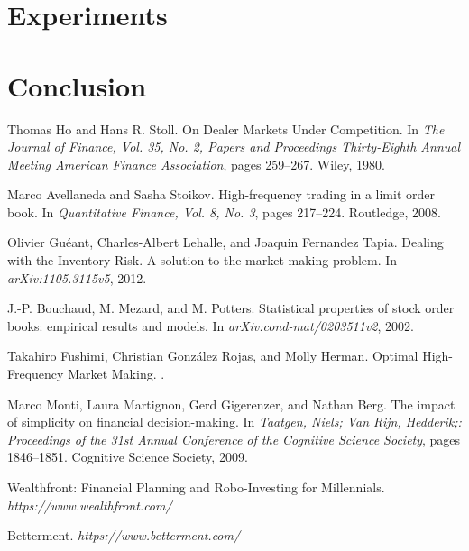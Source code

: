 \documentclass{article}
\begin{document}
\section{Experiments}
\label{sec:experiments}

\lipsum[3]
\lipsum[4]

\section{Conclusion}
\label{sec:conclusion}

\lipsum[5]

  

\begin{thebibliography}{1}

Thomas Ho and Hans R. Stoll.
\newblock On Dealer Markets Under Competition.
\newblock In {\em The Journal of Finance, Vol. 35, No. 2, Papers and Proceedings Thirty-Eighth Annual Meeting American Finance Association}, pages 259--267. Wiley, 1980.

Marco Avellaneda and Sasha Stoikov.
\newblock High-frequency trading in a limit order book.
\newblock In {\em Quantitative Finance, Vol. 8, No. 3}, pages 217--224. Routledge, 2008.

Olivier Guéant, Charles-Albert Lehalle, and Joaquin Fernandez Tapia.
\newblock Dealing with the Inventory Risk. A solution to the market making problem.
\newblock In {\em 	arXiv:1105.3115v5}, 2012.

J.-P. Bouchaud, M. Mezard, and M. Potters.
\newblock Statistical properties of stock order books: empirical results and models.
\newblock In {\em arXiv:cond-mat/0203511v2}, 2002.

Takahiro Fushimi, Christian González Rojas, and Molly Herman.
\newblock Optimal High-Frequency Market Making.
.

Marco Monti, Laura Martignon, Gerd Gigerenzer, and Nathan Berg.
\newblock The impact of simplicity on financial decision-making.
\newblock In {\em Taatgen, Niels; Van Rijn, Hedderik;: Proceedings of the 31st Annual Conference of the Cognitive Science Society}, pages 1846--1851. Cognitive Science Society, 2009.

Wealthfront: Financial Planning and Robo-Investing for Millennials.
\newblock \emph{https://www.wealthfront.com/}

Betterment.
\newblock \emph{https://www.betterment.com/}

\end{thebibliography}
\end{document}
